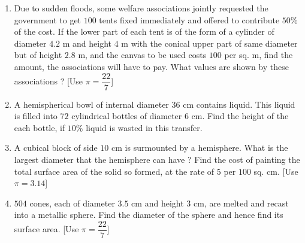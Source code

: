\begin{enumerate}
\item Due to sudden floods, some welfare associations jointly requested the government to get $100$ tents fixed immediately and offered to contribute $ 50\% $ of the cost. If the lower part of each tent is of the form of a cylinder of diameter $4.2$ m and height $4$ m with the conical upper part of same diameter but of height $2.8$ m, and the canvas to be used costs \rupee $100$ per sq. m, find the amount, the associations will have to pay. What values are shown by these associations ? [Use $\pi=\dfrac{22}{7}$]
\item A hemispherical bowl of internal diameter $36$ cm contains liquid. This liquid is filled into $72$ cylindrical bottles of diameter $6$ cm. Find the height of the each bottle, if $10 \% $ liquid is wasted in this transfer.
\item A cubical block of side $10$ cm is surmounted by a hemisphere. What is the largest diameter that the hemisphere can have ? Find the cost of painting the total surface area of the solid so formed, at the rate of \rupee $5$ per $100$ sq. cm. [Use $\pi= 3.14$]
\item $504$ cones, each of diameter $3.5$ cm and height $3$ cm, are melted and recast into a metallic sphere. Find the diameter of the sphere and hence find its surface area. [Use $\pi=\dfrac{22}{7}$]



\end{enumerate}
